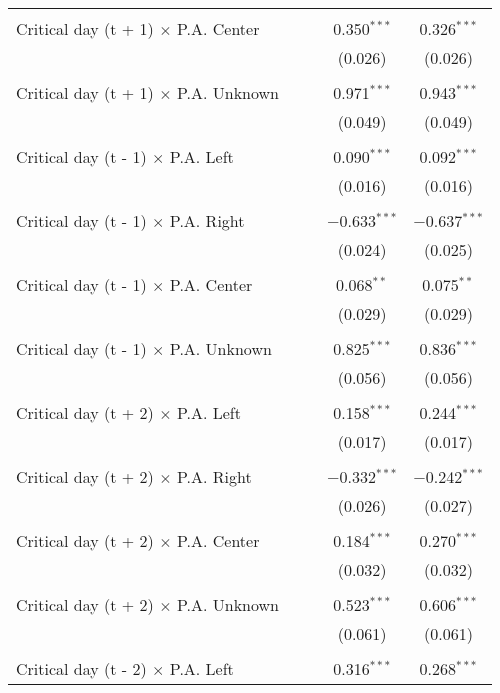 \documentclass[
]{article}
\begin{document}
\begin{table}[!htbp]
{\begin{tabular}{@{\extracolsep{5pt}}lcccc}
  & & & & \\ 
 Critical day (t + 1) $\times$ P.A. Center &  &  & 0.350$^{***}$ & 0.326$^{***}$ \\ 
  &  &  & (0.026) & (0.026) \\ 
  & & & & \\ 
 Critical day (t + 1) $\times$ P.A. Unknown &  &  & 0.971$^{***}$ & 0.943$^{***}$ \\ 
  &  &  & (0.049) & (0.049) \\ 
  & & & & \\ 
 Critical day (t - 1) $\times$ P.A. Left &  &  & 0.090$^{***}$ & 0.092$^{***}$ \\ 
  &  &  & (0.016) & (0.016) \\ 
  & & & & \\ 
 Critical day (t - 1) $\times$ P.A. Right &  &  & $-$0.633$^{***}$ & $-$0.637$^{***}$ \\ 
  &  &  & (0.024) & (0.025) \\ 
  & & & & \\ 
 Critical day (t - 1) $\times$ P.A. Center &  &  & 0.068$^{**}$ & 0.075$^{**}$ \\ 
  &  &  & (0.029) & (0.029) \\ 
  & & & & \\ 
 Critical day (t - 1) $\times$ P.A. Unknown &  &  & 0.825$^{***}$ & 0.836$^{***}$ \\ 
  &  &  & (0.056) & (0.056) \\ 
  & & & & \\ 
 Critical day (t + 2) $\times$ P.A. Left &  &  & 0.158$^{***}$ & 0.244$^{***}$ \\ 
  &  &  & (0.017) & (0.017) \\ 
  & & & & \\ 
 Critical day (t + 2) $\times$ P.A. Right &  &  & $-$0.332$^{***}$ & $-$0.242$^{***}$ \\ 
  &  &  & (0.026) & (0.027) \\ 
  & & & & \\ 
 Critical day (t + 2) $\times$ P.A. Center &  &  & 0.184$^{***}$ & 0.270$^{***}$ \\ 
  &  &  & (0.032) & (0.032) \\ 
  & & & & \\ 
 Critical day (t + 2) $\times$ P.A. Unknown &  &  & 0.523$^{***}$ & 0.606$^{***}$ \\ 
  &  &  & (0.061) & (0.061) \\ 
  & & & & \\ 
 Critical day (t - 2) $\times$ P.A. Left &  &  & 0.316$^{***}$ & 0.268$^{***}$ \\ 

\end{tabular}}
\end{table}
\end{document}
